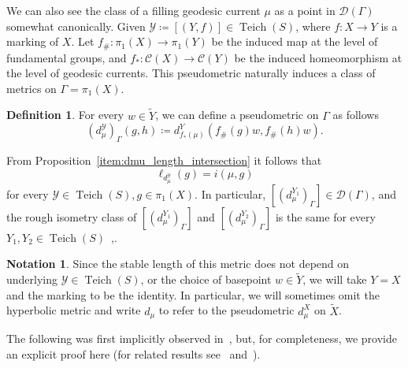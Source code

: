 \documentclass[12pt]{amsart}
\numberwithin{equation}{section}
\numberwithin{figure}{section}
\theoremstyle{definition}
\newtheorem{definition}[equation]{Definition}
\newtheorem{notation}[equation]{Notation}
\theoremstyle{plain}
\newcommand\C{\mathcal{C}}
\DeclareMathOperator{\Teich}{Teich}
\newcommand*{\wt}[1]{\widetilde{#1}}
\begin{document}
We can also see the class of a filling geodesic current $\mu$ as a point in $\mathcal{D}(\Gamma)$ somewhat canonically.  Given $\mathcal{Y} \coloneqq [(Y,f)] \in \Teich(S)$, where $f \colon X \to Y$ is a marking of $X$. Let $f_\# \colon \pi_1(X) \to \pi_1(Y)$ be the induced map at the level of fundamental groups, and $f_* \colon \C(X) \to \C(Y)$ be the induced homeomorphism at the level of geodesic currents.
This pseudometric naturally induces a class of metrics on $\Gamma=\pi_1(X)$.

\begin{definition}
For every $w \in \wt{Y}$, we can define a pseudometric on $\Gamma$ as follows
\[
(d_\mu^{\mathcal{Y}})_\Gamma(g,h) \coloneqq d_{f_*(\mu)}^Y(f_\#(g)w,f_\#(h)w).
\]
\label{def:pseudometric_G}
\end{definition}
From Proposition~\ref{item:dmu_length_intersection} it follows that
\[
\ell_{d_\mu^{\mathcal{Y}}}(g)=i(\mu, g)
\]
for every $\mathcal{Y} \in \Teich(S), g\in \pi_1(X)$.
In particular, $[(d_{\mu}^{Y_1})_\Gamma] \in \mathcal{D}(\Gamma)$, and the rough isometry class of $[(d_{\mu}^{Y_1})_\Gamma]$ and $[(d_{\mu}^{Y_2})_\Gamma]$ is the same for every $Y_1, Y_2 \in \Teich(S)$~\cite{DRMG23:Duals},\cite{COR22:Manhattan}. 

\begin{notation}
    Since the stable length of this metric does not depend on underlying $\mathcal{Y} \in \Teich(S)$, or the choice of basepoint $w \in \wt{Y}$, we will take $Y=X$ and the marking to be the identity.
In particular, we will sometimes omit the hyperbolic metric and write $d_\mu$ to refer to the pseudometric $d_\mu^X$ on $\wt{X}$.
\end{notation}

The following was first implicitly observed in~\cite{Sap23:Metric}, but, for completeness, we provide an explicit proof here (for related results see~\cite[Proposition~6.12]{CT25:Manhattan} and~\cite[Theorem~F]{DRMG23:Duals}).
\end{document}
